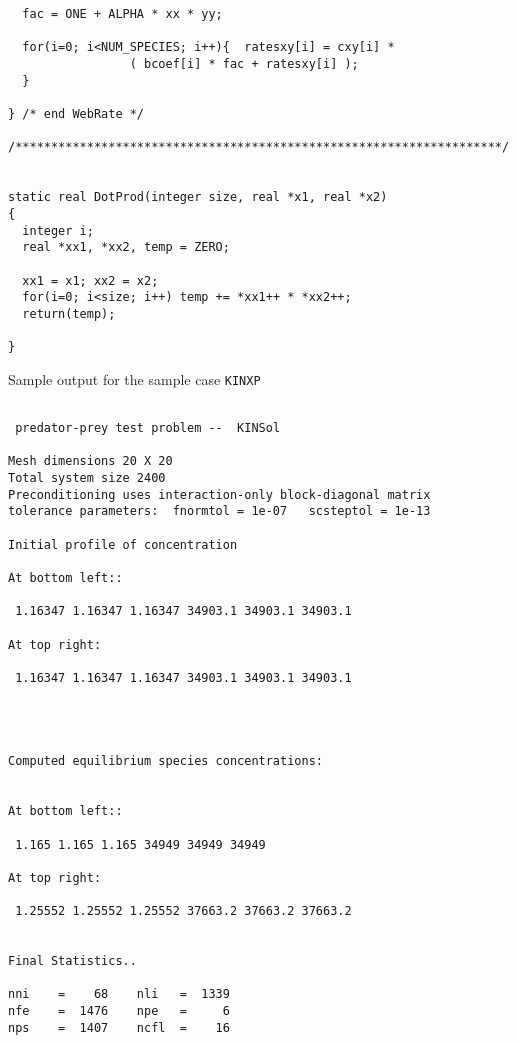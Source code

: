 \documentclass[11pt]{article}
\begin{document}
\begin{verbatim}
  fac = ONE + ALPHA * xx * yy;

  for(i=0; i<NUM_SPECIES; i++){  ratesxy[i] = cxy[i] *
                 ( bcoef[i] * fac + ratesxy[i] );
  }

} /* end WebRate */

/********************************************************************/


static real DotProd(integer size, real *x1, real *x2)
{
  integer i;
  real *xx1, *xx2, temp = ZERO;
  
  xx1 = x1; xx2 = x2;
  for(i=0; i<size; i++) temp += *xx1++ * *xx2++;
  return(temp);

}
\end{verbatim}
\newpage
\normalsize

Sample output for the sample case {\tt KINXP}

\small
\begin{verbatim}

 predator-prey test problem --  KINSol

Mesh dimensions 20 X 20
Total system size 2400
Preconditioning uses interaction-only block-diagonal matrix
tolerance parameters:  fnormtol = 1e-07   scsteptol = 1e-13

Initial profile of concentration

At bottom left::

 1.16347 1.16347 1.16347 34903.1 34903.1 34903.1

At top right:

 1.16347 1.16347 1.16347 34903.1 34903.1 34903.1




Computed equilibrium species concentrations:


At bottom left::

 1.165 1.165 1.165 34949 34949 34949

At top right:

 1.25552 1.25552 1.25552 37663.2 37663.2 37663.2


Final Statistics.. 

nni    =    68    nli   =  1339
nfe    =  1476    npe   =     6
nps    =  1407    ncfl  =    16



\end{verbatim}
\normalsize
\end{document}
